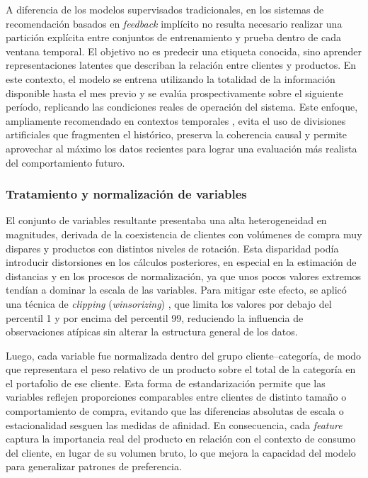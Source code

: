 A diferencia de los modelos supervisados tradicionales, en los sistemas de recomendación basados en \textit{feedback} implícito no resulta necesario realizar una partición explícita entre conjuntos de entrenamiento y prueba dentro de cada ventana temporal. El objetivo no es predecir una etiqueta conocida, sino aprender representaciones latentes que describan la relación entre clientes y productos. En este contexto, el modelo se entrena utilizando la totalidad de la información disponible hasta el mes previo y se evalúa prospectivamente sobre el siguiente período, replicando las condiciones reales de operación del sistema. Este enfoque, ampliamente recomendado en contextos temporales \cite{ARTICLE:Koren2010,BOOK:Aggarwal2016}, evita el uso de divisiones artificiales que fragmenten el histórico, preserva la coherencia causal y permite aprovechar al máximo los datos recientes para lograr una evaluación más realista del comportamiento futuro.

\subsubsection{Tratamiento y normalizaci\'on de variables}

El conjunto de variables resultante presentaba una alta heterogeneidad en magnitudes, derivada de la coexistencia de clientes con volúmenes de compra muy dispares y productos con distintos niveles de rotación. Esta disparidad podía introducir distorsiones en los cálculos posteriores, en especial en la estimación de distancias y en los procesos de normalización, ya que unos pocos valores extremos tendían a dominar la escala de las variables. Para mitigar este efecto, se aplicó una técnica de \textit{clipping} (\textit{winsorizing}) \cite{BOOK:Aggarwal2015}, que limita los valores por debajo del percentil 1 y por encima del percentil 99, reduciendo la influencia de observaciones atípicas sin alterar la estructura general de los datos. 

Luego, cada variable fue normalizada dentro del grupo cliente–categoría, de modo que representara el peso relativo de un producto sobre el total de la categoría en el portafolio de ese cliente.  Esta forma de estandarización permite que las variables reflejen proporciones comparables entre clientes de distinto tamaño o comportamiento de compra, evitando que las diferencias absolutas de escala o estacionalidad sesguen las medidas de afinidad. En consecuencia, cada \textit{feature} captura la importancia real del producto en relación con el contexto de consumo del cliente, en lugar de su volumen bruto, lo que mejora la capacidad del modelo para generalizar patrones de preferencia.

